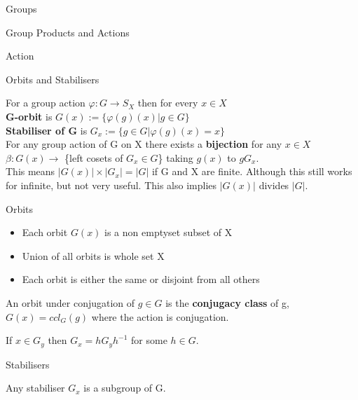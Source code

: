 \documentclass[12pt, letterpaper]{article}
\begin{document}
\begin{section}{Groups}
\begin{subsection}{Group Products and Actions}
\begin{subsubsection}{Action}
    \end{subsubsection}

  \end{subsection}

  \begin{subsection}{Orbits and Stabilisers}

    For a group action \(\varphi : G \to S_{X}\) then for every \(x \in X\) \\
    \textbf{G-orbit} is \(G(x) := \{ \varphi(g)(x) | g \in G \}\) \\
    \textbf{Stabiliser of G} is \(G_{x} := \{ g \in G | \varphi(g)(x) = x \}\) \\

    For any group action of G on X there exists a \textbf{bijection} for any
    \(x \in X\) \(\beta : G(x) \to\) \{left cosets of \(G_{x} \in G\)\} taking
    \(g(x)\) to \(gG_{x}\). \\
    This means \(|G(x)| \times |G_{x}| = |G|\) if G and X are finite. Although
    this still works for infinite, but not very useful. This also implies
    \(|G(x)|\) divides \(|G|\).

    \begin{subsubsection}{Orbits}

      \begin{itemize}
        \item Each orbit \(G(x)\) is a non emptyset subset of X
        \item Union of all orbits is whole set X
        \item Each orbit is either the same or disjoint from all others
      \end{itemize}

      An orbit under conjugation of \(g \in G\) is the \textbf{conjugacy class}
      of g, \(G(x) = ccl_{G}(g)\) where the action is conjugation.

      If \(x \in G_{y}\) then \(G_{x} = hG_{y}h^{-1}\) for some \(h \in G\).

    \end{subsubsection}

    \begin{subsubsection}{Stabilisers}

      Any stabiliser \(G_{x}\) is a subgroup of G.

    \end{subsubsection}

  \end{subsection}

\end{section}
\end{document}
